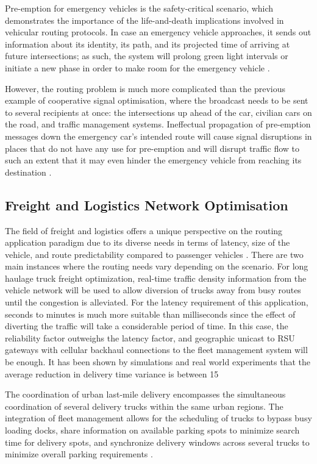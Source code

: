 \documentclass[12pt]{article}
\begin{document}
Pre-emption for emergency vehicles is the safety-critical scenario, which demonstrates the importance of the life-and-death implications involved in vehicular routing protocols. In case an emergency vehicle approaches, it sends out information about its identity, its path, and its projected time of arriving at future intersections; as such, the system will prolong green light intervals or initiate a new phase in order to make room for the emergency vehicle \cite{hartenstein2008tutorial}.

However, the routing problem is much more complicated than the previous example of cooperative signal optimisation, where the broadcast needs to be sent to several recipients at once: the intersections up ahead of the car, civilian cars on the road, and traffic management systems. Ineffectual propagation of pre-emption messages down the emergency car’s intended route will cause signal disruptions in places that do not have any use for pre-emption and will disrupt traffic flow to such an extent that it may even hinder the emergency vehicle from reaching its destination \cite{vegni2015survey}.

\subsection{Freight and Logistics Network Optimisation}

The field of freight and logistics offers a unique perspective on the routing application paradigm due to its diverse needs in terms of latency, size of the vehicle, and route predictability compared to passenger vehicles \cite{akyildiz2005wireless}. There are two main instances where the routing needs vary depending on the scenario.
For long haulage truck freight optimization, real-time traffic density information from the vehicle network will be used to allow diversion of trucks away from busy routes until the congestion is alleviated. For the latency requirement of this application, seconds to minutes is much more suitable than milliseconds since the effect of diverting the traffic will take a considerable period of time. In this case, the reliability factor outweighs the latency factor, and geographic unicast to RSU gateways with cellular backhaul connections to the fleet management system will be enough. It has been shown by simulations and real world experiments that the average reduction in delivery time variance is between 15%

The coordination of urban last-mile delivery encompasses the simultaneous coordination of several delivery trucks within the same urban regions. The integration of fleet management allows for the scheduling of trucks to bypass busy loading docks, share information on available parking spots to minimize search time for delivery spots, and synchronize delivery windows across several trucks to minimize overall parking requirements \cite{akyildiz2005wireless}.
\end{document}
